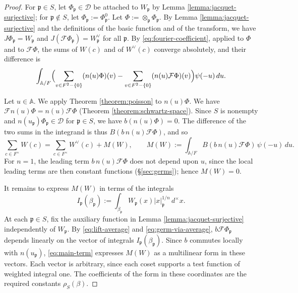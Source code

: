 \documentclass[reqno]{amsart}
\theoremstyle{plain}
\theoremstyle{definition}
\theoremstyle{itplain}
\numberwithin{equation}{section}
\numberwithin{theorem}{section}
\begin{document}
\begin{proof}
  For $\mathfrak{p} \in S$, let $\Phi_{\mathfrak{p}} \in \mathcal{D}$ be attached to $W_{\mathfrak{p}}$ by Lemma \ref{lemma:jacquet-surjective}; for $\mathfrak{p} \notin S$, let $\Phi_{\mathfrak{p}} := \Phi_{\mathfrak{p}}^0$.  Let $\Phi := \otimes_{\mathfrak{p}} \Phi_{\mathfrak{p}}$.  By Lemma \ref{lemma:jacquet-surjective} and the definitions of the basic function and of the transform, we have $J \Phi_{\mathfrak{p}} = W_{\mathfrak{p}}$ and $J(\mathcal{F} \Phi_{\mathfrak{p}}) = W_{\mathfrak{p}}^\vee$ for all $\mathfrak{p}$.  By \eqref{eq:fourier-coefficient}, applied to $\Phi$ and to $\mathcal{F} \Phi$, the sums of $W(c)$ and of $W^\vee(c)$ converge absolutely, and their difference is
  \begin{equation*}
    \int_{\mathbb{A} / F} \Bigl( \sum_{v \in F^2 - \{0\}} (n(u) \Phi)(v) - \sum_{v \in F^2 - \{0\}} (n(u) \mathcal{F} \Phi)(v) \Bigr) \psi(-u) \, d u.
  \end{equation*}

  Let $u \in \mathbb{A}$.  We apply Theorem \ref{theorem:poisson} to $n(u) \Phi$.  We have $\mathcal{F} n(u) \Phi = n(u) \mathcal{F} \Phi$ (Theorem \ref{theorem:schwartz-space}).  Since $S$ is nonempty and $n(u_{\mathfrak{p}}) \Phi_{\mathfrak{p}} \in \mathcal{D}$ for $\mathfrak{p} \in S$, we have $b (n(u) \Phi) = 0$.  The difference of the two sums in the integrand is thus $B(b \, n(u) \mathcal{F} \Phi)$, and so
  \begin{equation}\label{eq:main-term}
    \sum_{c \in F^\times} W(c) = \sum_{c \in F^\times} W^\vee(c) + M(W),
    \qquad
    M(W) := \int_{\mathbb{A} / F} B(b \, n(u) \mathcal{F} \Phi) \, \psi(-u) \, d u.
  \end{equation}
  For $n = 1$, the leading term $b \, n(u) \mathcal{F} \Phi$ does not depend upon $u$, since the local leading terms are then constant functions (\S\ref{sec:germs}); hence $M(W) = 0$.

  It remains to express $M(W)$ in terms of the integrals
  \begin{equation*}
    I_{\mathfrak{p}}(\beta_{\mathfrak{p}}) := \int_{\beta_{\mathfrak{p}}} W_{\mathfrak{p}}(x) \lvert x \rvert_{\mathfrak{p}}^{1/n} \, d^\times x.
  \end{equation*}
  At each $\mathfrak{p} \in S$, fix the auxiliary function in Lemma \ref{lemma:jacquet-surjective} independently of $W_{\mathfrak{p}}$.  By \eqref{eq:lift-average} and \eqref{eq:germ-via-average}, $b \mathcal{F} \Phi_{\mathfrak{p}}$ depends linearly on the vector of integrals $I_{\mathfrak{p}}(\beta_{\mathfrak{p}})$.  Since $b$ commutes locally with $n(u_{\mathfrak{p}})$, \eqref{eq:main-term} expresses $M(W)$ as a multilinear form in these vectors.  Each vector is arbitrary, since each coset supports a test function of weighted integral one.  The coefficients of the form in these coordinates are the required constants $\rho_S(\beta)$.
\end{proof}
\end{document}
